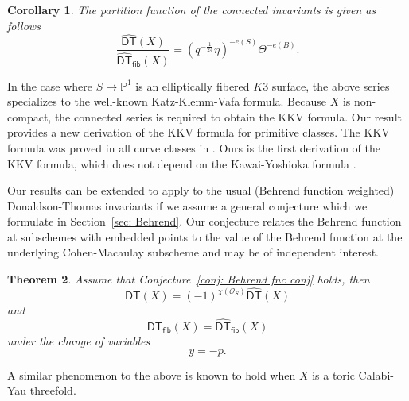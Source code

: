 \documentclass[12pt]{amsart}
\newtheorem{theorem}{Theorem}%
\newtheorem{corollary}[theorem]{Corollary}
\theoremstyle{definition}
\newcommand{\PP} {\mathbb{P}}
\renewcommand{\O}{\mathcal{O}}
\newcommand{\DT}{\mathsf{DT}}
\newcommand{\DThat}{\widehat{\DT}}
\newcommand{\fiber}{\mathsf{fib}}
\begin{document}
\begin{corollary} The partition function of the connected invariants is given as follows
\[
\frac{\DThat (X)}{\DThat_{\fiber}(X)}=
\left(q^{-\frac{1}{24}}\eta  \right)^{-e(S)}\Theta^{-e(B)}.
\]
\end{corollary}

In the case where $S \rightarrow \PP^1$ is an elliptically fibered $K3$
surface, the above series specializes to the well-known
Katz-Klemm-Vafa formula. Because $X$ is non-compact, the connected
series is required to obtain the KKV formula. Our result provides a
new derivation of the KKV formula for primitive classes. The KKV
formula was proved in all curve classes in
\cite{Pandharipande-Thomas-KKV}. Ours is the first derivation of the
KKV formula, which does not depend on the Kawai-Yoshioka formula
\cite{Kawai-Yoshioka}.

Our results can be extended to apply to the usual (Behrend function
weighted) Donaldson-Thomas invariants if we assume a general
conjecture which we formulate in Section~\ref{sec: Behrend}. Our
conjecture relates the Behrend function at subschemes with embedded
points to the value of the Behrend function at the underlying
Cohen-Macaulay subscheme and may be of independent interest.

\begin{theorem}\label{thm: DT(X) assuming the Behrend function conjecture}
Assume that Conjecture~\ref{conj: Behrend fnc conj} holds, then
\[
\DT (X) = (-1)^{\chi (\O_{S})} \DThat (X)
\]
and
\[
\DT_{\fiber } (X) =  \DThat_{\fiber } (X)
\]
under the change of variables
\[
y=-p.
\]
\end{theorem}

A similar phenomenon to the above is known to hold when $X$ is a toric
Calabi-Yau threefold.
\end{document}
